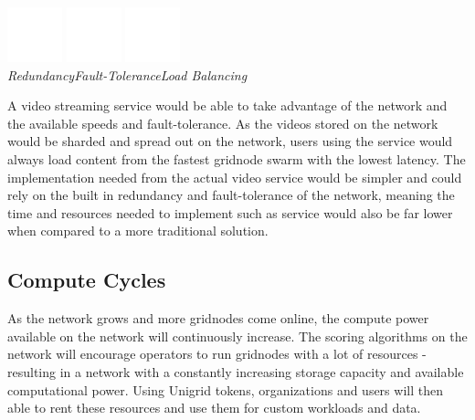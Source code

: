 \documentclass{article}
\begin{document}
\begin{center}
\vspace{0.1cm}
\includegraphics[width=45pt]{redundancy}
\hspace{1.5cm}
\includegraphics[width=45pt]{tolerance}
\hspace{1.5cm}
\includegraphics[width=45pt]{load-balance}
\\
\vspace{0.12cm}
\hspace{8pt}\emph{Redundancy}\hspace{38pt}\emph{Fault-Tolerance}\hspace{30pt}\emph{Load Balancing}
\end{center}

\noindent A video streaming service would be able to take advantage of the network and the available speeds and fault-tolerance. As the videos stored on the network would be sharded and spread out on the network, users using the service would always load content from the fastest gridnode swarm with the lowest latency. The implementation needed from the actual video service would be simpler and could rely on the built in redundancy and fault-tolerance of the network, meaning the time and resources needed to implement such as service would also be far lower when compared to a more traditional solution.

\subsection{Compute Cycles}
As the network grows and more gridnodes come online, the compute power available on the network will continuously increase. The scoring algorithms on the network will encourage operators to run gridnodes with a lot of resources - resulting in a network with a constantly increasing storage capacity and available computational power. Using Unigrid tokens, organizations and users will then able to rent these resources and use them for custom workloads and data.
\end{document}
